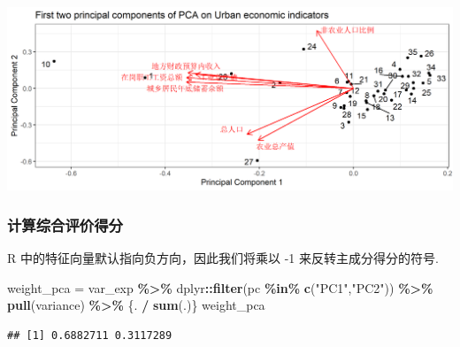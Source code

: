 \documentclass[
]{article}
\newenvironment{Shaded}{\begin{snugshade}}{\end{snugshade}}
\newcommand{\FunctionTok}[1]{\textcolor[rgb]{0.13,0.29,0.53}{\textbf{#1}}}
\newcommand{\NormalTok}[1]{#1}
\newcommand{\OtherTok}[1]{\textcolor[rgb]{0.56,0.35,0.01}{#1}}
\newcommand{\SpecialCharTok}[1]{\textcolor[rgb]{0.81,0.36,0.00}{\textbf{#1}}}
\newcommand{\StringTok}[1]{\textcolor[rgb]{0.31,0.60,0.02}{#1}}
\begin{document}
\begin{center}\includegraphics[width=1\linewidth,height=1\textheight]{../picture/rmd/exp6/pac_plot2-1.png} \end{center}

\subsubsection{计算综合评价得分}\label{ux8ba1ux7b97ux7efcux5408ux8bc4ux4ef7ux5f97ux5206}

R 中的特征向量默认指向负方向，因此我们将乘以 -1 来反转主成分得分的符号.

\begin{Shaded}
\begin{Highlighting}[]
\NormalTok{weight\_pca }\OtherTok{=}\NormalTok{ var\_exp }\SpecialCharTok{\%\textgreater{}\%} 
\NormalTok{  dplyr}\SpecialCharTok{::}\FunctionTok{filter}\NormalTok{(pc }\SpecialCharTok{\%in\%} \FunctionTok{c}\NormalTok{(}\StringTok{"PC1"}\NormalTok{,}\StringTok{"PC2"}\NormalTok{)) }\SpecialCharTok{\%\textgreater{}\%} 
  \FunctionTok{pull}\NormalTok{(variance) }\SpecialCharTok{\%\textgreater{}\%} 
\NormalTok{  \{. }\SpecialCharTok{/} \FunctionTok{sum}\NormalTok{(.)\}}
\NormalTok{weight\_pca}
\end{Highlighting}
\end{Shaded}

\begin{verbatim}
## [1] 0.6882711 0.3117289
\end{verbatim}
\end{document}
